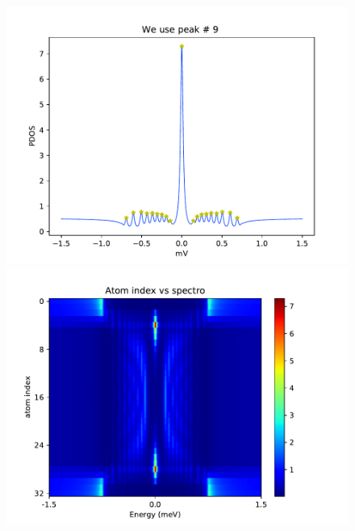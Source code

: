 \documentclass[letterpaper,12pt]{article}
\begin{document}
\begin{figure}[h!]
    \centering
    \includegraphics[scale = .5]{spectro.pdf}
    \includegraphics[scale = .5]{map.pdf}
    

\end{figure}
\end{document}
